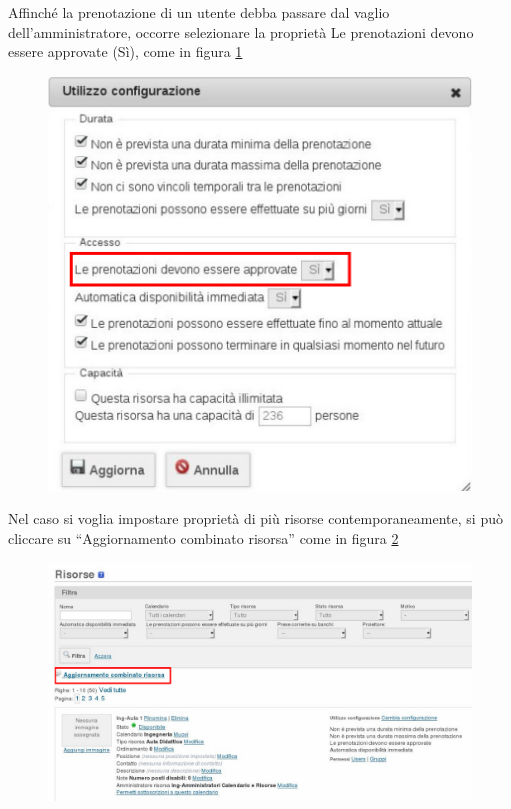 Affinché la prenotazione di un utente debba passare dal vaglio dell'amministratore,
occorre selezionare la proprietà
Le prenotazioni devono essere approvate (Sì), come in figura
\ref{fig:risorsa_configurazione_proprieta_approvazione.pdf}

\begin{figure}[H]
\centering{}\includegraphics[scale=0.7]{Immagini/risorsa_configurazione_proprieta_approvazione.pdf}
\normalsize
\caption{}
\label{fig:risorsa_configurazione_proprieta_approvazione.pdf}
\end{figure}

Nel caso si voglia impostare proprietà di più risorse contemporaneamente, si può cliccare su
``Aggiornamento combinato risorsa'' come in figura
\ref{fig:risorsa_selezione_configurazione_multipla.pdf}

\begin{figure}[H]
\centering{}\includegraphics[scale=0.5]{Immagini/risorsa_selezione_configurazione_multipla.pdf}
\normalsize
\caption{}
\label{fig:risorsa_selezione_configurazione_multipla.pdf}
\end{figure}
